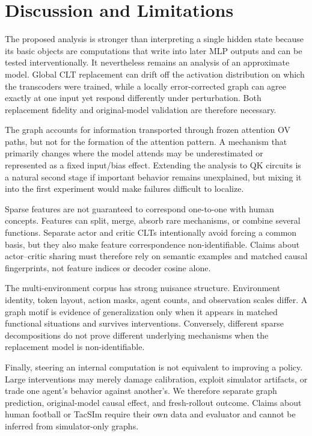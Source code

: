 \section{Discussion and Limitations}

The proposed analysis is stronger than interpreting a single hidden state because its basic objects are computations that write into later MLP outputs and can be tested interventionally. It nevertheless remains an analysis of an approximate model. Global CLT replacement can drift off the activation distribution on which the transcoders were trained, while a locally error-corrected graph can agree exactly at one input yet respond differently under perturbation. Both replacement fidelity and original-model validation are therefore necessary.

The graph accounts for information transported through frozen attention OV paths, but not for the formation of the attention pattern. A mechanism that primarily changes where the model attends may be underestimated or represented as a fixed input/bias effect. Extending the analysis to QK circuits is a natural second stage if important behavior remains unexplained, but mixing it into the first experiment would make failures difficult to localize.

Sparse features are not guaranteed to correspond one-to-one with human concepts. Features can split, merge, absorb rare mechanisms, or combine several functions. Separate actor and critic CLTs intentionally avoid forcing a common basis, but they also make feature correspondence non-identifiable. Claims about actor--critic sharing must therefore rely on semantic examples and matched causal fingerprints, not feature indices or decoder cosine alone.

The multi-environment corpus has strong nuisance structure. Environment identity, token layout, action masks, agent counts, and observation scales differ. A graph motif is evidence of generalization only when it appears in matched functional situations and survives interventions. Conversely, different sparse decompositions do not prove different underlying mechanisms when the replacement model is non-identifiable.

Finally, steering an internal computation is not equivalent to improving a policy. Large interventions may merely damage calibration, exploit simulator artifacts, or trade one agent's behavior against another's. We therefore separate graph prediction, original-model causal effect, and fresh-rollout outcome. Claims about human football or TacSIm require their own data and evaluator and cannot be inferred from simulator-only graphs.
